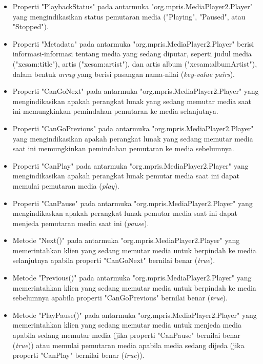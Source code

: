 \begin{itemize}
    \item Properti "PlaybackStatus" pada antarmuka "org.mpris.MediaPlayer2.Player" yang mengindikasikan status pemutaran media ("Playing", "Paused", atau "Stopped").

    \item Properti "Metadata" pada antarmuka "org.mpris.MediaPlayer2.Player" berisi informasi-informasi tentang media yang sedang diputar, seperti judul media ("xesam:title"), artis ("xesam:artist"), dan artis album ("xesam:albumArtist"), dalam bentuk \textit{array} yang berisi pasangan nama-nilai (\textit{key-value pairs}).
    
    \item Properti "CanGoNext" pada antarmuka "org.mpris.MediaPlayer2.Player" yang mengindikasikan apakah perangkat lunak yang sedang memutar media saat ini memungkinkan pemindahan pemutaran ke media selanjutnya.
    
    \item Properti "CanGoPrevious" pada antarmuka "org.mpris.MediaPlayer2.Player" yang mengindikasikan apakah perangkat lunak yang sedang memutar media saat ini memungkinkan pemindahan pemutaran ke media sebelumnya.
    
    \item Properti "CanPlay" pada antarmuka "org.mpris.MediaPlayer2.Player" yang mengindikasikan apakah perangkat lunak pemutar media saat ini dapat memulai pemutaran media (\textit{play}).
    
    \item Properti "CanPause" pada antarmuka "org.mpris.MediaPlayer2.Player" yang mengindikaskan apakah perangkat lunak pemutar media saat ini dapat menjeda pemutaran media saat ini (\textit{pause}).
    
    \item Metode "Next()" pada antarmuka "org.mpris.MediaPlayer2.Player" yang memerintahkan klien yang sedang memutar media untuk berpindah ke media selanjutnya apabila properti "CanGoNext" bernilai benar (\textit{true}).
    
    \item Metode "Previous()" pada antarmuka "org.mpris.MediaPlayer2.Player" yang memerintahkan klien yang sedang memutar media untuk berpindah ke media sebelumnya apabila properti "CanGoPrevious" bernilai benar (\textit{true}).
    
    \item Metode "PlayPause()" pada antarmuka "org.mpris.MediaPlayer2.Player" yang memerintahkan klien yang sedang memutar media untuk menjeda media apabila sedang memutar media (jika properti "CanPause" bernilai benar (\textit{true})) atau memulai pemutaran media apabila media sedang dijeda (jika properti "CanPlay" bernilai benar (\textit{true})).
    

\end{itemize}
